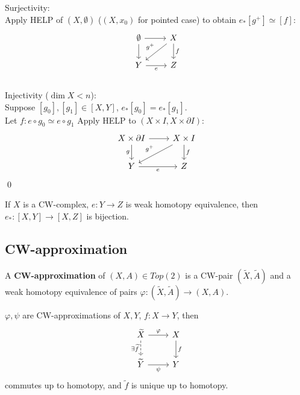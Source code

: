     \begin{prf}
        Surjectivity:\\
        Apply HELP of $(X,\emptyset)$ ($(X,x_0)$ for pointed case) to obtain $e_{\ast} [g^+] \simeq [f] $:
        \[\begin{tikzcd}
            \emptyset & X \\
            Y & Z
            \arrow[from=1-1, to=1-2]
            \arrow["f", from=1-2, to=2-2]
            \arrow[from=1-1, to=2-1]
            \arrow["e"', from=2-1, to=2-2]
            \arrow["{g^+}"', from=1-2, to=2-1]
        \end{tikzcd}\]\\
        Injectivity ($\dim{X} < n$):\\
        Suppose $[g_0],[g_1] \in [X,Y]$, $e_{\ast}[g_0] = e_{\ast}[g_1]$.\\
        Let $f : e \circ g_0 \simeq e \circ g_1$
        Apply HELP to $(X \times I, X  \times \partial I)$:
        \[\begin{tikzcd}
            {X\times \partial I} & {X \times I} \\
            Y & Z
            \arrow[from=1-1, to=1-2]
            \arrow["f", from=1-2, to=2-2]
            \arrow["g"', from=1-1, to=2-1]
            \arrow["e"', from=2-1, to=2-2]
            \arrow["{g^+}"', from=1-2, to=2-1]
        \end{tikzcd}\]
        \qed
    \end{prf}

    \begin{cor}
        If $X$ is a CW-complex, $e : Y \to Z$ is weak homotopy equivalence,
        then $e_{\ast} : [X,Y] \to [X,Z]$ is bijection.
    \end{cor}

    \subsection{CW-approximation}

    \begin{defn}
        A \textbf{CW-approximation} of $(X,A) \in Top(2)$ is a CW-pair $(\widetilde{X}, \widetilde{A})$ and a
        weak homotopy equivalence of pairs $\varphi : (\widetilde{X}, \widetilde{A}) \to (X,A)$.
    \end{defn}

    \begin{lem}
        $\varphi, \psi$ are CW-approximations of $X,Y$,
        $f : X \to Y$, then 
        \[\begin{tikzcd}
            {\widetilde{X}} & X \\
            {\widetilde{Y}} & Y
            \arrow["{\exists \widetilde{f}}"', dashed, from=1-1, to=2-1]
            \arrow["\varphi", from=1-1, to=1-2]
            \arrow["f", from=1-2, to=2-2]
            \arrow["\psi"', from=2-1, to=2-2]
        \end{tikzcd}\] commutes up to homotopy,
        and $\widetilde{f}$ is unique up to homotopy.
    \end{lem}

